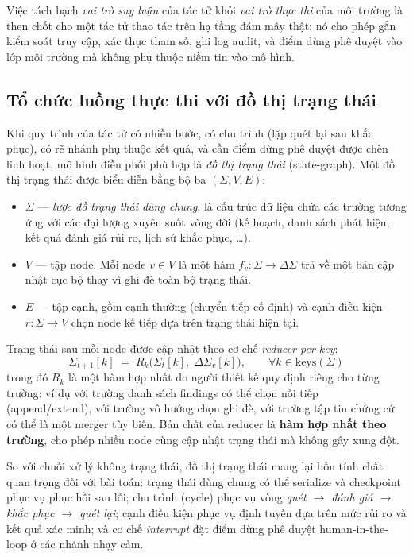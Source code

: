 Việc tách bạch \textit{vai trò suy luận} của tác tử khỏi \textit{vai trò thực thi} của môi trường là then chốt cho một tác tử thao tác trên hạ tầng đám mây thật: nó cho phép gắn kiểm soát truy cập, xác thực tham số, ghi log audit, và điểm dừng phê duyệt vào lớp môi trường mà không phụ thuộc niềm tin vào mô hình.

\subsection{Tổ chức luồng thực thi với đồ thị trạng thái}
\label{subsec:state-graph}

Khi quy trình của tác tử có nhiều bước, có chu trình (lặp quét lại sau khắc phục), có rẽ nhánh phụ thuộc kết quả, và cần điểm dừng phê duyệt được chèn linh hoạt, mô hình điều phối phù hợp là \textit{đồ thị trạng thái} (state-graph). Một đồ thị trạng thái được biểu diễn bằng bộ ba $(\Sigma, V, E)$:

\begin{itemize}
  \item $\Sigma$ --- \textit{lược đồ trạng thái dùng chung}, là cấu trúc dữ liệu chứa các trường tương ứng với các đại lượng xuyên suốt vòng đời (kế hoạch, danh sách phát hiện, kết quả đánh giá rủi ro, lịch sử khắc phục, \dots).
  \item $V$ --- tập node. Mỗi node $v \in V$ là một hàm $f_v: \Sigma \to \Delta\Sigma$ trả về một bản cập nhật cục bộ thay vì ghi đè toàn bộ trạng thái.
  \item $E$ --- tập cạnh, gồm cạnh thường (chuyển tiếp cố định) và cạnh điều kiện $r: \Sigma \to V$ chọn node kế tiếp dựa trên trạng thái hiện tại.
\end{itemize}

Trạng thái sau mỗi node được cập nhật theo cơ chế \textit{reducer per-key}:
\begin{equation}
  \Sigma_{t+1}[k] \;=\; R_k\!\big(\Sigma_t[k],\; \Delta\Sigma_v[k]\big), \qquad \forall k \in \mathrm{keys}(\Sigma)
  \label{eq:reducer}
\end{equation}
trong đó $R_k$ là một hàm hợp nhất do người thiết kế quy định riêng cho từng trường: ví dụ với trường danh sách findings có thể chọn nối tiếp (append/extend), với trường vô hướng chọn ghi đè, với trường tập tin chứng cứ có thể là một merger tùy biến. Bản chất của reducer là \textbf{hàm hợp nhất theo trường}, cho phép nhiều node cùng cập nhật trạng thái mà không gây xung đột.

So với chuỗi xử lý không trạng thái, đồ thị trạng thái mang lại bốn tính chất quan trọng đối với bài toán: trạng thái dùng chung có thể serialize và checkpoint phục vụ phục hồi sau lỗi; chu trình (cycle) phục vụ vòng \textit{quét \(\rightarrow\) đánh giá \(\rightarrow\) khắc phục \(\rightarrow\) quét lại}; cạnh điều kiện phục vụ định tuyến dựa trên mức rủi ro và kết quả xác minh; và cơ chế \textit{interrupt} đặt điểm dừng phê duyệt human-in-the-loop ở các nhánh nhạy cảm.

